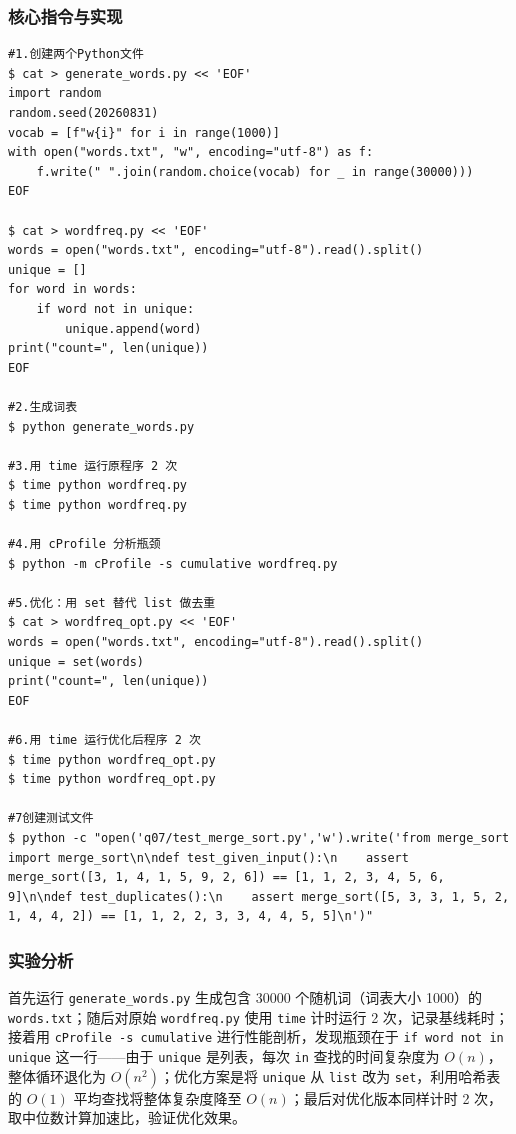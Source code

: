 \documentclass[12pt,a4paper]{article}
\begin{document}
\subsubsection{核心指令与实现}
\begin{lstlisting}[caption={实验四关键 Shell 指令}]
#1.创建两个Python文件
$ cat > generate_words.py << 'EOF'
import random
random.seed(20260831)
vocab = [f"w{i}" for i in range(1000)]
with open("words.txt", "w", encoding="utf-8") as f:
    f.write(" ".join(random.choice(vocab) for _ in range(30000)))
EOF

$ cat > wordfreq.py << 'EOF'
words = open("words.txt", encoding="utf-8").read().split()
unique = []
for word in words:
    if word not in unique:
        unique.append(word)
print("count=", len(unique))
EOF

#2.生成词表
$ python generate_words.py

#3.用 time 运行原程序 2 次
$ time python wordfreq.py
$ time python wordfreq.py

#4.用 cProfile 分析瓶颈
$ python -m cProfile -s cumulative wordfreq.py 

#5.优化：用 set 替代 list 做去重
$ cat > wordfreq_opt.py << 'EOF'
words = open("words.txt", encoding="utf-8").read().split()
unique = set(words)
print("count=", len(unique))
EOF

#6.用 time 运行优化后程序 2 次
$ time python wordfreq_opt.py
$ time python wordfreq_opt.py

#7创建测试文件
$ python -c "open('q07/test_merge_sort.py','w').write('from merge_sort import merge_sort\n\ndef test_given_input():\n    assert merge_sort([3, 1, 4, 1, 5, 9, 2, 6]) == [1, 1, 2, 3, 4, 5, 6, 9]\n\ndef test_duplicates():\n    assert merge_sort([5, 3, 3, 1, 5, 2, 1, 4, 4, 2]) == [1, 1, 2, 2, 3, 3, 4, 4, 5, 5]\n')"

\end{lstlisting}

\subsubsection{实验分析}
\begin{infobox}[实现思路]
首先运行 \texttt{generate\_words.py} 生成包含 30000 个随机词（词表大小 1000）的 \texttt{words.txt}；随后对原始 \texttt{wordfreq.py} 使用 \texttt{time} 计时运行 2 次，记录基线耗时；接着用 \texttt{cProfile -s cumulative} 进行性能剖析，发现瓶颈在于 \texttt{if word not in unique} 这一行——由于 \texttt{unique} 是列表，每次 \texttt{in} 查找的时间复杂度为 $O(n)$，整体循环退化为 $O(n^2)$；优化方案是将 \texttt{unique} 从 \texttt{list} 改为 \texttt{set}，利用哈希表的 $O(1)$ 平均查找将整体复杂度降至 $O(n)$；最后对优化版本同样计时 2 次，取中位数计算加速比，验证优化效果。
\end{infobox}
\end{document}
